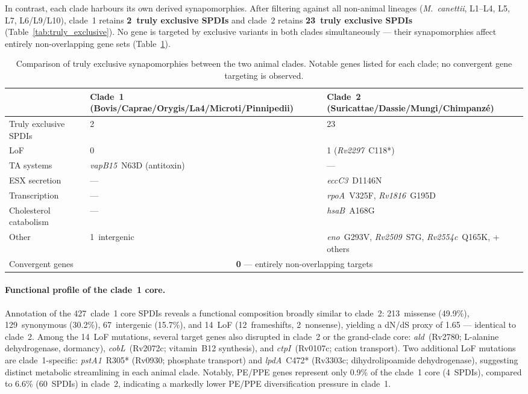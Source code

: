 \documentclass[11pt,a4paper]{article}
\begin{document}
In contrast, each clade harbours its own derived synapomorphies.
%
After filtering against all non-animal lineages (\textit{M.~canettii},
L1--L4, L5, L7, L6/L9/L10), clade~1 retains \textbf{2~truly exclusive
SPDIs} and clade~2 retains \textbf{23~truly exclusive SPDIs}
(Table~\ref{tab:truly_exclusive}).
%
No gene is targeted by exclusive variants in both clades simultaneously
--- their synapomorphies affect entirely non-overlapping gene sets
(Table~\ref{tab:inter_clade}).

\begin{table}[h]
\centering
\caption{Comparison of truly exclusive synapomorphies between the two
animal clades. Notable genes listed for each clade; no convergent gene
targeting is observed.}
\label{tab:inter_clade}
\begin{tabular}{@{}p{3.5cm}p{5.5cm}p{5.5cm}@{}}
\toprule
 & \textbf{Clade~1} (Bovis/Caprae/Orygis/La4/Microti/Pinnipedii) & \textbf{Clade~2} (Suricattae/Dassie/Mungi/Chimpanzé) \\
\midrule
Truly exclusive SPDIs & 2 & 23 \\
LoF & 0 & 1 (\textit{Rv2297}~C118*) \\
\addlinespace
TA systems & \textit{vapB15}~N63D (antitoxin) & --- \\
ESX secretion & --- & \textit{eccC3}~D1146N \\
Transcription & --- & \textit{rpoA}~V325F, \textit{Rv1816}~G195D \\
Cholesterol catabolism & --- & \textit{hsaB}~A168G \\
Other & 1~intergenic & \textit{eno}~G293V, \textit{Rv2509}~S7G, \textit{Rv2554c}~Q165K, + others \\
Convergent genes & \multicolumn{2}{c}{\textbf{0} --- entirely non-overlapping targets} \\
\bottomrule
\end{tabular}
\end{table}

\paragraph{Functional profile of the clade~1 core.}
Annotation of the 427~clade~1 core SPDIs reveals a functional composition
broadly similar to clade~2: 213~missense (49.9\%), 129~synonymous (30.2\%),
67~intergenic (15.7\%), and 14~LoF (12~frameshifts, 2~nonsense), yielding a
dN/dS proxy of 1.65 --- identical to clade~2.
%
Among the 14~LoF mutations, several target genes also disrupted in clade~2 or the
grand-clade core: \textit{ald}~(Rv2780; L-alanine dehydrogenase, dormancy),
\textit{cobL}~(Rv2072c; vitamin~B12 synthesis), and \textit{ctpI}~(Rv0107c; cation
transport). Two additional LoF mutations are clade~1-specific:
\textit{pstA1}~R305* (Rv0930; phosphate transport) and
\textit{lpdA}~C472* (Rv3303c; dihydrolipoamide dehydrogenase), suggesting
distinct metabolic streamlining in each animal clade.
%
Notably, PE/PPE genes represent only 0.9\% of the clade~1 core (4~SPDIs),
compared to 6.6\% (60~SPDIs) in clade~2, indicating a markedly lower
PE/PPE diversification pressure in clade~1.
\end{document}
